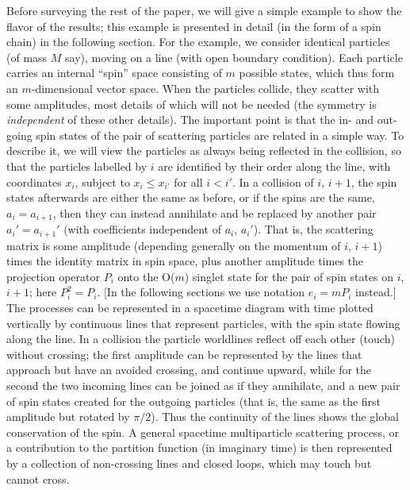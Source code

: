 \documentclass[twocolumn,floats,pra]{revtex4}
\begin{document}
Before surveying the rest of the paper, we will give a simple
example to show the flavor of the results; this example is
presented in detail (in the form of a spin chain) in the following
section. For the example, we consider identical particles (of mass
$M$ say), moving on a line (with open boundary condition). Each
particle carries an internal ``spin'' space consisting of $m$
possible states, which thus form an $m$-dimensional vector space.
When the particles collide, they scatter with some amplitudes,
most details of which will not be needed (the symmetry is {\em
independent} of these other details). The important point is that
the in- and out-going spin states of the pair of scattering
particles are related in a simple way. To describe it, we will
view the particles as always being reflected in the collision, so
that the particles labelled by $i$ are identified by their order
along the line, with coordinates $x_i$, subject to $x_i\leq
x_{i'}$ for all $i<{i'}$. In a collision of $i$, $i+1$, the spin
states afterwards are either the same as before, or if the spins
are the same, $a_i=a_{i+1}$, then they can instead annihilate and
be replaced by another pair $a_i'=a_{i+1}'$ (with coefficients
independent of $a_i$, $a_i'$). That is, the scattering matrix is
some amplitude (depending generally on the momentum of $i$, $i+1$)
times the identity matrix in spin space, plus another amplitude
times the projection operator $P_i$ onto the O($m$) singlet state
for the pair of spin states on $i$, $i+1$; here $P_i^2=P_i$. [In
the following sections we use notation $e_i=mP_i$ instead.] The
processes can be represented in a spacetime diagram with time
plotted vertically by continuous lines that represent particles,
with the spin state flowing along the line. In a collision the
particle worldlines reflect off each other (touch) without
crossing; the first amplitude can be represented by the lines that
approach but have an avoided crossing, and continue upward, while
for the second the two incoming lines can be joined as if they
annihilate, and a new pair of spin states created for the outgoing
particles (that is, the same as the first amplitude but rotated by
$\pi/2$). Thus the continuity of the lines shows the global
conservation of the spin. A general spacetime multiparticle
scattering process, or a contribution to the partition function
(in imaginary time) is then represented by a collection of
non-crossing lines and closed loops, which may touch but cannot
cross.
\end{document}
